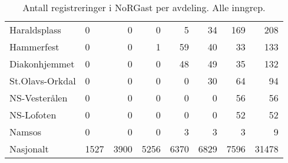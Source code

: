 \documentclass[norsk,a4paper]{article}\usepackage[]{graphicx}\usepackage[]{color}
\begin{document}
\begin{table}[ht]
\begin{tabular}{llrrrrrr}
  Haraldsplass & 0 & 0 & 0 & 5 & 34 & 169 & 208 \\ 
  Hammerfest & 0 & 0 & 1 & 59 & 40 & 33 & 133 \\ 
  Diakonhjemmet & 0 & 0 & 0 & 48 & 49 & 35 & 132 \\ 
  St.Olavs-Orkdal & 0 & 0 & 0 & 0 & 30 & 64 & 94 \\ 
  NS-Vesterålen & 0 & 0 & 0 & 0 & 0 & 56 & 56 \\ 
  NS-Lofoten & 0 & 0 & 0 & 0 & 0 & 52 & 52 \\ 
  Namsos & 0 & 0 & 0 & 3 & 3 & 3 & 9 \\ 
   \midrule
Nasjonalt & 1527 & 3900 & 5256 & 6370 & 6829 & 7596 & 31478 \\ 
   \hline
\end{tabular}
\caption{Antall registreringer i NoRGast per avdeling. Alle inngrep.} 
\end{table}
\end{document}
